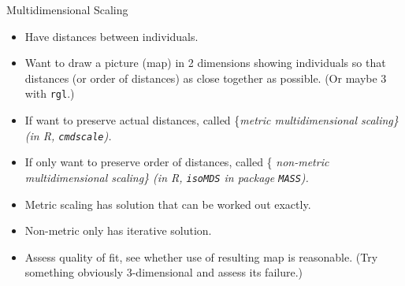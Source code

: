 \documentclass[ignorenonframetext,]{beamer}
\begin{document}
\begin{frame}[fragile]{Multidimensional Scaling}
\protect\hypertarget{multidimensional-scaling-1}{}

\begin{itemize}
\item
  Have distances between individuals.
\item
  Want to draw a picture (map) in 2 dimensions showing individuals so
  that distances (or order of distances) as close together as possible.
  (Or maybe 3 with \texttt{rgl}.)
\item
  If want to preserve actual distances, called \{\em metric
  multidimensional scaling\} (in R, \texttt{cmdscale}).
\item
  If only want to preserve order of distances, called \{\em
  non-metric multidimensional scaling\} (in R, \texttt{isoMDS} in
  package \texttt{MASS}).
\item
  Metric scaling has solution that can be worked out exactly.
\item
  Non-metric only has iterative solution.
\item
  Assess quality of fit, see whether use of resulting map is reasonable.
  (Try something obviously 3-dimensional and assess its failure.)
\end{itemize}

\end{frame}
\end{document}
